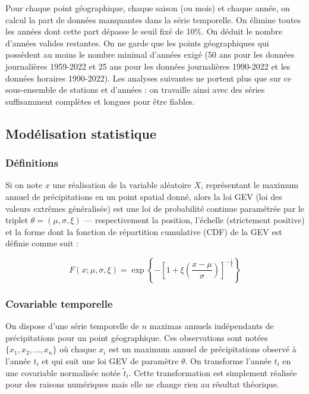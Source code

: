 \documentclass[
  article,
  nofooter,
  noheadings]{jss}
\begin{document}
Pour chaque point géographique, chaque saison (ou mois) et chaque année,
on calcul la part de données manquantes dans la série temporelle. On
élimine toutes les années dont cette part dépasse le seuil fixé de 10\%.
On déduit le nombre d'années valides restantes. On ne garde que les
points géographiques qui possèdent au moins le nombre minimal d'années
exigé (50 ans pour les données journalières 1959-2022 et 25 ans pour les
données journalières 1990-2022 et les données horaires 1990-2022). Les
analyses suivantes ne portent plus que sur ce sous‑ensemble de stations
et d'années : on travaille ainsi avec des séries suffisamment complètes
et longues pour être fiables.

\subsection{Modélisation statistique}\label{moduxe9lisation-statistique}

\subsubsection{Définitions}\label{duxe9finitions}

Si on note \(x\) une réalisation de la variable aléatoire \(X\),
représentant le maximum annuel de précipitations en un point spatial
donné, alors la loi GEV (loi des valeurs extrêmes généralisée) est une
loi de probabilité continue paramétrée par le triplet
\(\theta = (\mu, \sigma, \xi)\) --- respectivement la position,
l'échelle (strictement positive) et la forme dont la fonction de
répartition cumulative (CDF) de la GEV est définie comme suit :

\[
F(x;\mu ,\sigma ,\xi ) = \exp \left\{ -\left[ 1 + \xi \left( \frac{x - \mu}{\sigma} \right) \right]^{-\frac{1}{\xi}} \right\}
\]

\subsubsection{Covariable temporelle}\label{covariable-temporelle}

On dispose d'une série temporelle de \(n\) maximas annuels indépendants
de précipitations pour un point géographique. Ces observations sont
notées \(\{x_1, x_2, \dots, x_n\}\) où chaque \(x_i\) est un maximum
annuel de précipitations observé à l'année \(t_i\) et qui suit une loi
GEV de paramètre \(\theta\). On transforme l'année \(t_i\) en une
covariable normalisée notée \(\tilde{t}_i\). Cette transformation est
simplement réalisée pour des raisons numériques mais elle ne change rien
au résultat théorique.
\end{document}
